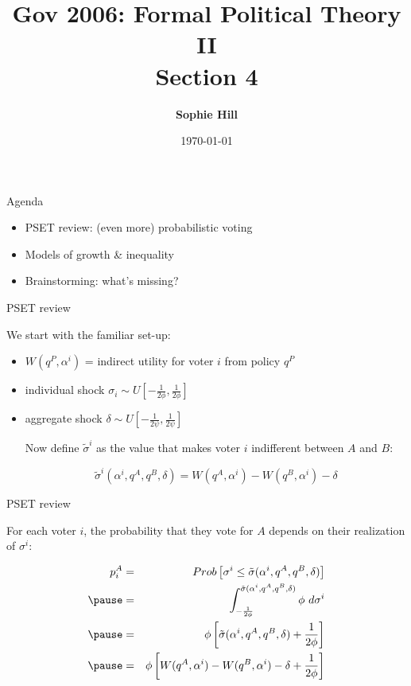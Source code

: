 \documentclass[aspectratio=169]{beamer}
\title{Gov 2006: Formal Political Theory II \\
Section 4}
\date{\today}
\author{ \textbf{Sophie Hill}}
\begin{document}
  \maketitle
  

\begin{frame}{Agenda}

\Large

\begin{itemize}
\setlength{\itemsep}{1.5em}

\item PSET review: (even more) probabilistic voting 

\item Models of growth \& inequality 

\item Brainstorming: what's missing?

\end{itemize}

\end{frame}
\begin{frame}{PSET review}

We start with the familiar set-up:

\begin{itemize}
\item $W(q^P, \alpha^i)$ = indirect utility for voter $i$ from policy $q^P$
\item individual shock $\sigma_i \sim U \left[ -\frac{1}{2 \phi}, \frac{1}{2 \phi} \right]$  
\item aggregate shock $\delta \sim U \left[ -\frac{1}{2 \psi}, \frac{1}{2 \psi} \right]$ 

\pause 
\vspace{2em}
\noindent Now define $\tilde{\sigma}^i$ as the value that makes voter $i$ indifferent between $A$ and $B$:


$$ \tilde{\sigma}^i(\alpha^i, q^A, q^B, \delta) = W(q^A, \alpha^i) - W(q^B, \alpha^i) - \delta $$


\end{itemize}
\end{frame}
\begin{frame}{PSET review}

For each voter $i$, the probability that they vote for $A$ depends on their realization of $\sigma^i$:

\pause
\begin{eqnarray*}
p_i^A &=& Prob \left[ \sigma^i \leq \tilde{\sigma}(\alpha^i, q^A, q^B, \delta) \right] \\
\pause 
&=&  \int_{-\frac{1}{2\phi}}^{\tilde{\sigma}(\alpha^i, q^A, q^B, \delta)} \phi \, \, d \sigma^i  \\
\pause
&=& \phi \left[ \tilde{\sigma}(\alpha^i, q^A, q^B, \delta) + \frac{1}{2 \phi} \right] \\
\pause
&=& \phi \left[ W(q^A, \alpha^i) - W(q^B, \alpha^i) - \delta + \frac{1}{2 \phi} \right]
\end{eqnarray*}



\end{frame}
\end{document}
